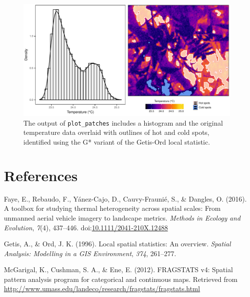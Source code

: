 \documentclass[12pt,british,a4paper,]{article}
\begin{document}
\begin{figure}[H]

{\centering \includegraphics{./output/fig-1-1} 

}

\caption{The output of \texttt{plot\_patches} includes a histogram and the original temperature data overlaid with outlines of hot and cold spots, identified using the G* variant of the Getis-Ord local statistic.}\label{fig:fig-1}
\end{figure}

\pagebreak

\hypertarget{references}{%
\section*{References}\label{references}}

\hypertarget{refs}{}
\leavevmode\hypertarget{ref-faye_toolbox_2016}{}%
Faye, E., Rebaudo, F., Yánez-Cajo, D., Cauvy-Fraunié, S., \& Dangles, O. (2016). A toolbox for studying thermal heterogeneity across spatial scales: From unmanned aerial vehicle imagery to landscape metrics. \emph{Methods in Ecology and Evolution}, \emph{7}(4), 437--446. doi:\href{https://doi.org/10.1111/2041-210X.12488}{10.1111/2041-210X.12488}

\leavevmode\hypertarget{ref-getis_local_1996}{}%
Getis, A., \& Ord, J. K. (1996). Local spatial statistics: An overview. \emph{Spatial Analysis: Modelling in a GIS Environment}, \emph{374}, 261--277.

\leavevmode\hypertarget{ref-fragstats_2012}{}%
McGarigal, K., Cushman, S. A., \& Ene, E. (2012). FRAGSTATS v4: Spatial pattern analysis program for categorical and continuous maps. Retrieved from \url{http://www.umass.edu/landeco/research/fragstats/fragstats.html}
\end{document}
